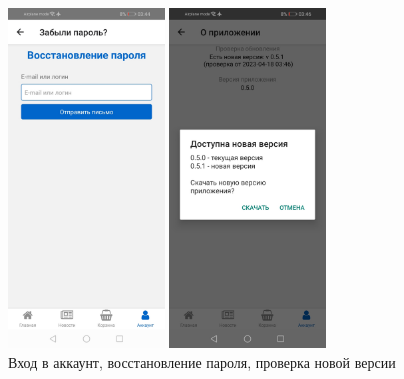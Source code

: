 \begin{figure}[!p]
\begin{minipage}{0.24\textwidth}
        \includegraphics[height=9cm]
        {images/android/account-forget-password.jpg}
    \end{minipage}
    \begin{minipage}{0.24\textwidth}
        \centering

        \includegraphics[height=9cm]
        {images/android/account-versions.jpg}
    \end{minipage}

    \caption{Вход в аккаунт, восстановление пароля, проверка новой версии}
    \label{fig:android_login}
\end{figure}

